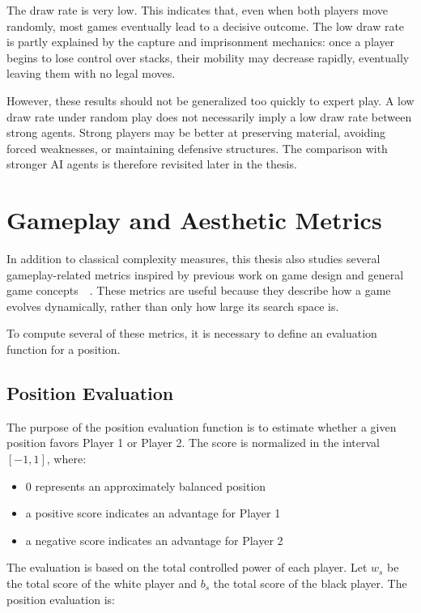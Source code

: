 The draw rate is very low. This indicates that, even when both players move randomly, most games eventually lead to a decisive outcome. The low draw rate is partly explained by the capture and imprisonment mechanics: once a player begins to lose control over stacks, their mobility may decrease rapidly, eventually leaving them with no legal moves.

However, these results should not be generalized too quickly to expert play. A low draw rate under random play does not necessarily imply a low draw rate between strong agents. Strong players may be better at preserving material, avoiding forced weaknesses, or maintaining defensive structures. The comparison with stronger AI agents is therefore revisited later in the thesis.

\section{Gameplay and Aesthetic Metrics}

In addition to classical complexity measures, this thesis also studies several gameplay-related metrics inspired by previous work on game design and general game concepts~\cite{browne2010evolutionary}~\cite{browne2008recombination}. These metrics are useful because they describe how a game evolves dynamically, rather than only how large its search space is.

To compute several of these metrics, it is necessary to define an evaluation function for a position.

\subsection{Position Evaluation}

The purpose of the position evaluation function is to estimate whether a given position favors Player 1 or Player 2. The score is normalized in the interval $[-1,1]$, where:

\begin{itemize} 
    \item 0 represents an approximately balanced position
    \item a positive score indicates an advantage for Player 1
    \item a negative score indicates an advantage for Player 2
\end{itemize}

The evaluation is based on the total controlled power of each player. Let $w_s$ be the total score of the white player and $b_s$ the total score of the black player. The position evaluation is:

